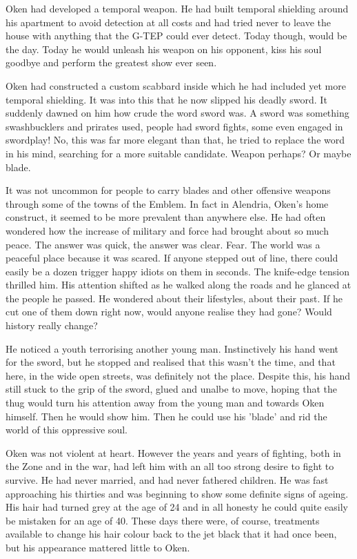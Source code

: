 Oken had developed a temporal weapon. He had built temporal shielding around his apartment to avoid detection at all costs and had tried never to leave the house with anything that the G-TEP could ever detect. Today though, would be the day. Today he would unleash his weapon on his opponent, kiss his soul goodbye and perform the greatest show ever seen.

Oken had constructed a custom scabbard inside which he had included yet more temporal shielding. It was into this that he now slipped his deadly sword. It suddenly dawned on him how crude the word sword was. A sword was something swashbucklers and prirates used, people had sword fights, some even engaged in swordplay! No, this was far more elegant than that, he tried to replace the word in his mind, searching for a more suitable candidate. Weapon perhaps? Or maybe blade.

It was not uncommon for people to carry blades and other offensive weapons through some of the towns of the Emblem. In fact in Alendria, Oken's home construct, it seemed to be more prevalent than anywhere else. He had often wondered how the increase of military and force had brought about so much peace. The answer was quick, the answer was clear. Fear. The world was a peaceful place because it was scared. If anyone stepped out of line, there could easily be a dozen trigger happy idiots on them in seconds. The knife-edge tension thrilled him. His attention shifted as he walked along the roads and he glanced at the people he passed. He wondered about their lifestyles, about their past. If he cut one of them down right now, would anyone realise they had gone? Would history really change?

He noticed a youth terrorising another young man. Instinctively his hand went for the sword, but he stopped and realised that this wasn't the time, and that here, in the wide open streets, was definitely not the place. Despite this, his hand still stuck to the grip of the sword, glued and unalbe to move, hoping that the thug would turn his attention away from the young man and towards Oken himself. Then he would show him. Then he could use his 'blade' and rid the world of this oppressive soul.

Oken was not violent at heart. However the years and years of fighting, both in the Zone and in the war, had left him with an all too strong desire to fight to survive. He had never married, and had never fathered children. He was fast approaching his thirties and was beginning to show some definite signs of ageing. His hair had turned grey at the age of 24 and in all honesty he could quite easily be mistaken for an age of 40. These days there were, of course, treatments available to change his hair colour back to the jet black that it had once been, but his appearance mattered little to Oken.

